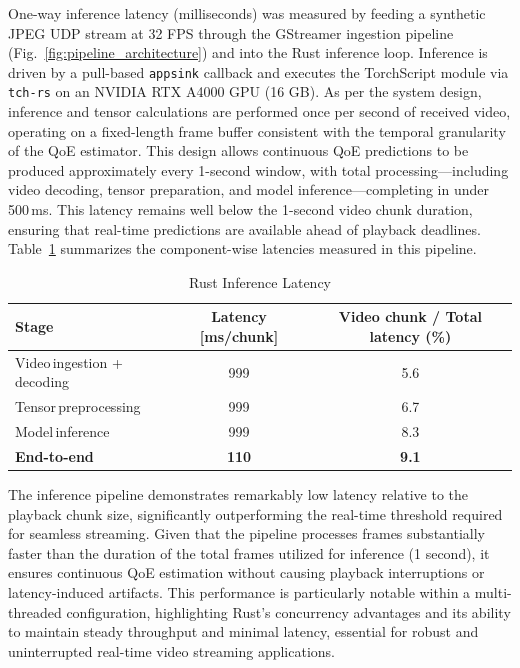 One-way inference latency (milliseconds) was measured by feeding a synthetic JPEG UDP stream at 32 FPS through the GStreamer ingestion pipeline 
(Fig.~\ref{fig:pipeline_architecture}) and into the Rust inference loop. Inference is driven by a pull-based \texttt{appsink} callback and executes the 
TorchScript module via \texttt{tch-rs} on an NVIDIA RTX A4000 GPU (16 GB). As per the system design, inference and tensor calculations are performed once 
per second of received video, operating on a fixed-length frame buffer consistent with the temporal granularity of the QoE estimator. This design allows continuous 
QoE predictions to be produced approximately every 1-second window, with total processing—including video decoding, tensor preparation, and model inference—completing 
in under 500\,ms. This latency remains well below the 1-second video chunk duration, ensuring that real-time predictions are available ahead of playback deadlines. 
Table~\ref{tab:throughput_latency} summarizes the component-wise latencies measured in this pipeline.


\begin{table}[h]
  \centering
  \caption{Rust Inference Latency}
  \label{tab:throughput_latency}
  \begin{tabular}{lcc}
    \toprule
    Stage                 & Latency [ms/chunk] & Video chunk / Total latency (\%) \\
    \midrule
    Video\,ingestion + decoding & 999             & 5.6                \\
    Tensor\,preprocessing       & 999             & 6.7                \\
    Model\,inference            & 999             & 8.3                \\
    \textbf{End-to-end}         & \textbf{110}    & \textbf{9.1}       \\
    \bottomrule
  \end{tabular}
\end{table}

The inference pipeline demonstrates remarkably low latency relative to the playback chunk size, significantly outperforming the real-time 
threshold required for seamless streaming. Given that the pipeline processes frames substantially faster than the duration of the total frames 
utilized for inference (1 second), it ensures continuous QoE estimation without causing playback interruptions or latency-induced artifacts. 
This performance is particularly notable within a multi-threaded configuration, highlighting Rust's concurrency advantages and its ability to 
maintain steady throughput and minimal latency, essential for robust and uninterrupted real-time video streaming applications.

